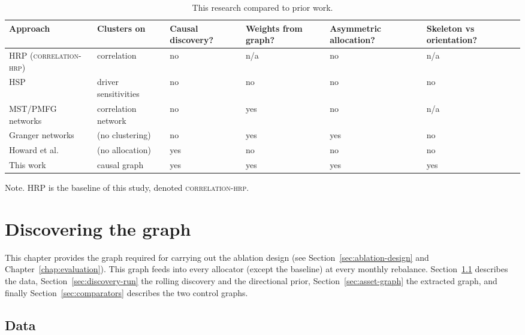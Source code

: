 \documentclass[11pt, a4paper]{report}
\newcommand{\corrhrp}{\textsc{correlation-hrp}}
\newcommand{\floatnote}[1]{\par\vspace{3pt}\begin{minipage}{0.92\textwidth}\footnotesize Note. #1\end{minipage}\par}
\begin{document}
\begin{table}
  \centering
  \caption{This research compared to prior work.}
  \vspace{0.5em}
  \label{tab:gap}
  \begin{tabular}{l l >{\centering\arraybackslash}p{2.3cm} >{\centering\arraybackslash}p{2.5cm} >{\centering\arraybackslash}p{2.5cm} >{\centering\arraybackslash}p{2.6cm}}
    \toprule
    Approach & Clusters on & Causal discovery? & Weights from graph? & Asymmetric allocation? & Skeleton vs orientation? \\
    \midrule
    HRP \cite{lopezdeprado2016hrp} (\corrhrp{}) & correlation & no & n/a & no & n/a \\
    HSP \cite{rodriguez2023hsp} & driver sensitivities & no & no & no & no \\
    MST/PMFG networks \cite{pozzi2013spread,peralta2016network} & correlation network & no & yes & no & n/a \\
    Granger networks \cite{vyrost2019network} & (no clustering) & no & yes & yes & no \\
    Howard et al.\ \cite{howard2025causal} & (no allocation)  & yes & no  & no & no \\
    This work                     & causal graph & yes & yes & yes & yes \\
    \bottomrule
  \end{tabular}
  \floatnote{HRP is the baseline of this study, denoted \corrhrp{}.}
\end{table}

\chapter{Discovering the graph}
\label{chap:discovery}

This chapter provides the graph required for carrying out the ablation design (see Section~\ref{sec:ablation-design} and Chapter~\ref{chap:evaluation}). This graph feeds into every allocator (except the baseline) at every monthly rebalance.
Section~\ref{sec:data} describes the data,
Section~\ref{sec:discovery-run} the rolling discovery and the
directional prior, Section~\ref{sec:asset-graph} the extracted graph, and finally Section~\ref{sec:comparators}
describes the two control graphs.

\section{Data}
\label{sec:data}
\end{document}

